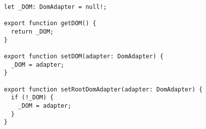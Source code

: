\begin{verbatim}
let _DOM: DomAdapter = null!;

export function getDOM() {
  return _DOM;
}

export function setDOM(adapter: DomAdapter) {
  _DOM = adapter;
}

export function setRootDomAdapter(adapter: DomAdapter) {
  if (!_DOM) {
    _DOM = adapter;
  }
}
\end{verbatim}
